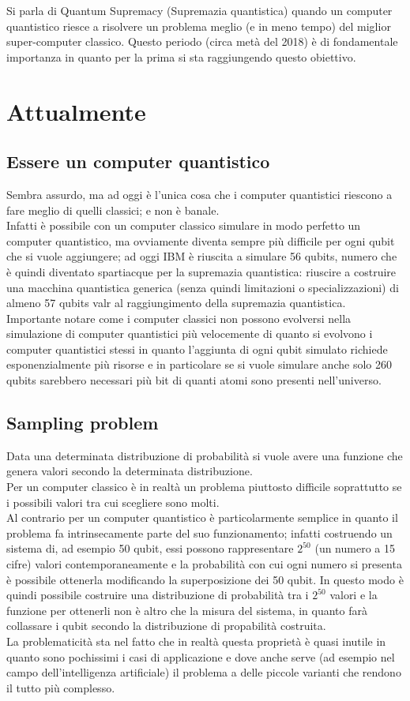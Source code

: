 Si parla di Quantum Supremacy (Supremazia quantistica) quando un computer quantistico riesce a risolvere un problema meglio (e in meno tempo) del miglior super-computer classico. Questo periodo (circa metà del 2018) è di fondamentale importanza in quanto per la prima si sta raggiungendo questo obiettivo.
\section{Attualmente}
\subsection{Essere un computer quantistico}
Sembra assurdo, ma ad oggi è l'unica cosa che i computer quantistici riescono a fare meglio di quelli classici; e non è banale.\\
Infatti è possibile con un computer classico simulare in modo perfetto un computer quantistico, ma ovviamente diventa sempre più difficile per ogni qubit che si vuole aggiungere; ad oggi IBM è riuscita a simulare 56 qubits, numero che è quindi diventato spartiacque per la supremazia quantistica: riuscire a costruire una macchina quantistica generica (senza quindi limitazioni o specializzazioni) di almeno 57 qubits valr al raggiungimento della supremazia quantistica.\\
Importante notare come i computer classici non possono evolversi nella simulazione di computer quantistici più velocemente di quanto si evolvono i computer quantistici stessi in quanto l'aggiunta di ogni qubit simulato richiede esponenzialmente più risorse e in particolare se si vuole simulare anche solo 260 qubits sarebbero necessari più bit di quanti atomi sono presenti nell'universo.
\subsection{Sampling problem}
Data una determinata distribuzione di probabilità si vuole avere una funzione che genera valori secondo la determinata distribuzione.\\
Per un computer classico è in realtà un problema piuttosto difficile soprattutto se i possibili valori tra cui scegliere sono molti.\\
Al contrario per un computer quantistico è particolarmente semplice in quanto il problema fa intrinsecamente parte del suo funzionamento; infatti costruendo un sistema di, ad esempio 50 qubit, essi possono rappresentare $2^{50}$ (un numero a 15 cifre) valori contemporaneamente e la probabilità con cui ogni numero si presenta è possibile ottenerla modificando la superposizione dei 50 qubit. In questo modo è quindi possibile costruire una distribuzione di probabilità tra i $2^{50}$ valori e la funzione per ottenerli non è altro che la misura del sistema, in quanto farà collassare i qubit secondo la distribuzione di propabilità costruita.\\
La problematicità sta nel fatto che in realtà questa proprietà è quasi inutile in quanto sono pochissimi i casi di applicazione e dove anche serve (ad esempio nel campo dell'intelligenza artificiale) il problema a delle piccole varianti che rendono il tutto più complesso.
